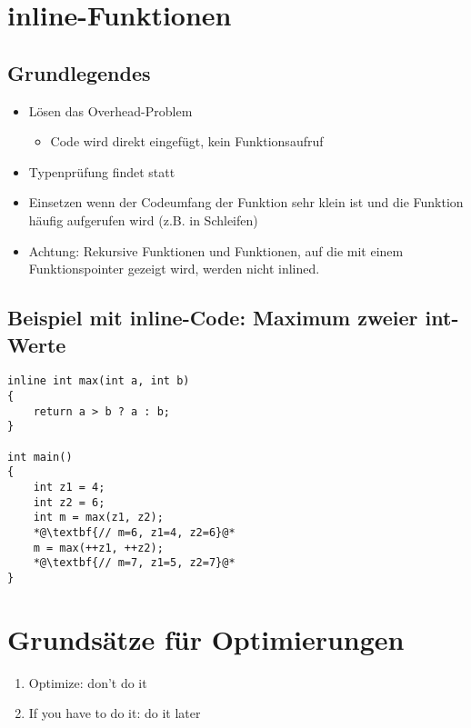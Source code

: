 \section{inline-Funktionen}
\label{sec:inline}

\begin{multicols}{2}
\subsection{Grundlegendes}
\begin{itemize}
	\item Lösen das Overhead-Problem
	\begin{itemize}
		\item Code wird direkt eingefügt, kein Funktionsaufruf
	\end{itemize}
	\item Typenprüfung findet statt
	\item Einsetzen wenn der Codeumfang der Funktion sehr klein ist und die Funktion häufig aufgerufen wird (z.B. in Schleifen)
	\item Achtung: Rekursive Funktionen und Funktionen, auf die mit einem Funktionspointer gezeigt wird, werden nicht inlined.
\end{itemize}
\vfill\null
\columnbreak
\subsection{Beispiel mit inline-Code: Maximum zweier int-Werte}
\begin{minipage}{\linewidth}
\vspace{-\baselineskip}
\begin{lstlisting}
inline int max(int a, int b)
{
	return a > b ? a : b;
}

int main()
{
	int z1 = 4;
	int z2 = 6;
	int m = max(z1, z2);
	*@\textbf{// m=6, z1=4, z2=6}@*
	m = max(++z1, ++z2);
	*@\textbf{// m=7, z1=5, z2=7}@*
}
\end{lstlisting}
\end{minipage}
\end{multicols}

\section{Grundsätze für Optimierungen}
\begin{enumerate}
	\item Optimize: don't do it
	\item If you have to do it: do it later
\end{enumerate} 
\vfill
\pagebreak\newpage

